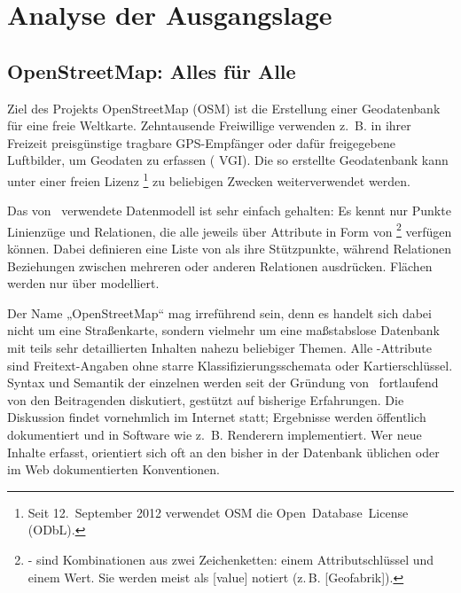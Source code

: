 \documentclass[../main/thesis.tex]{subfiles}
\begin{document}
\chapter{Analyse der Ausgangslage}
\label{ch:analysis}

\section{OpenStreetMap: Alles für Alle}
\label{ch:osm-intro}

Ziel des Projekts OpenStreetMap (OSM) ist die Erstellung einer Geodatenbank für eine freie Weltkarte. 
Zehntausende Freiwillige verwenden z.~B. in ihrer Freizeit preisgünstige tragbare GPS-Empfänger oder dafür freigegebene Luftbilder, um Geodaten zu erfassen ( VGI). 
Die so erstellte Geodatenbank kann unter einer freien Lizenz%
\footnote{Seit 12.~September 2012 verwendet OSM die Open~Database~License (ODbL). }
zu beliebigen Zwecken weiterverwendet werden. 


Das von \osm\ verwendete Datenmodell ist sehr einfach gehalten:
Es kennt nur Punkte  Linienzüge  und Relationen, die alle jeweils über Attribute  in Form von %
\footnote{\osm- sind Kombinationen aus zwei Zeichenketten: einem Attributschlüssel und einem Wert.  Sie werden meist als [value] notiert (z.\,B. [Geofabrik]).}
verfügen können.
Dabei definieren  eine Liste von  als ihre Stützpunkte, während Relationen Beziehungen zwischen mehreren   oder anderen Relationen ausdrücken.
Flächen werden nur über  modelliert.

Der Name „OpenStreetMap“ mag irreführend sein, denn es handelt sich dabei nicht um eine Straßenkarte, sondern vielmehr um eine maßstabslose Datenbank mit teils sehr detaillierten Inhalten nahezu beliebiger Themen. 
Alle \osm-Attribute sind Freitext-Angaben ohne starre Klassifizierungsschemata oder Kartierschlüssel.
Syntax und Semantik der einzelnen  werden seit der Gründung von \osm\ fortlaufend von den Beitragenden diskutiert, gestützt auf bisherige Erfahrungen.
Die Diskussion findet vornehmlich im Internet statt; Ergebnisse werden öffentlich dokumentiert und in Software wie z.~B. Renderern implementiert.
Wer neue Inhalte erfasst, orientiert sich oft an den bisher in der Datenbank üblichen oder im Web dokumentierten Konventionen. 
\end{document}
